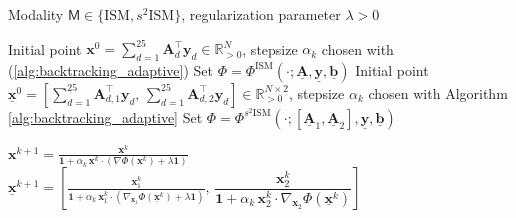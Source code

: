 \documentclass[letterpaper]{article}
\begin{document}
\begin{algorithm}
\caption{Mirror Descent with $\ell_1$ regularization for ISM and $s^2$ISM}
\label{alg:Mirror-L1-Combined}
\begin{algorithmic}[1]

\Require Modality $\mathsf{M}\in\{\mathrm{ISM},s^2\mathrm{ISM}\}$, regularization parameter $\lambda>0$

    \Require Initial point $\mathbf{x}^0=\sum_{d=1}^{25}\mathbf A_d^\top\mathbf y_d\in\mathbb R^N_{>0}$, stepsize $\alpha_k$ chosen with (\ref{alg:backtracking_adaptive})
    \State Set $\Phi=\Phi^{\mathrm{ISM}}(\cdot;\underline{\mathbf A},\underline{\mathbf y},\underline{\mathbf b})$
    \Require Initial point $\underline{\mathbf x}^0=
    \left[
    \sum_{d=1}^{25}\mathbf A_{d,1}^\top\mathbf y_d,\,
    \sum_{d=1}^{25}\mathbf A_{d,2}^\top\mathbf y_d
    \right]
    \in
    \mathbb R^{N\times2}_{>0}$,
    stepsize $\alpha_k$ chosen with Algorithm \ref{alg:backtracking_adaptive}
    \State Set $\Phi=\Phi^{s^2\mathrm{ISM}}(\cdot;[\underline{\mathbf A}_1,\underline{\mathbf A}_2],\underline{\mathbf y},\underline{\mathbf b})$
\EndIf


        \State $\mathbf x^{k+1}=
        \frac{
        \mathbf x^k
        }{
        \mathbf 1
        +
        \alpha_k\,\mathbf x^k\cdot
        \left(
        \nabla\Phi(\mathbf x^k)
        +
        \lambda\mathbf 1
        \right)
        }$
        \State $\underline{\mathbf x}^{k+1}=
        \left[
        \frac{
        \mathbf x_1^k
        }{
        \mathbf 1
        +
        \alpha_k\,\mathbf x_1^k\cdot
        \left(
        \nabla_{\mathbf x_1}\Phi(\underline{\mathbf x}^k)
        +
        \lambda\mathbf 1
        \right)
        },
        \,
        \dfrac{
        \mathbf x_2^k
        }{
        \mathbf 1
        +
        \alpha_k\,\mathbf x_2^k\cdot
        \nabla_{\mathbf x_2}\Phi(\underline{\mathbf x}^k)
        }
        \right]$
    \EndIf

\EndFor
\end{algorithmic}
\end{algorithm}
\end{document}
